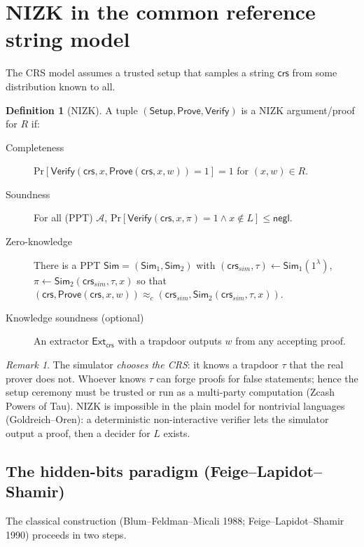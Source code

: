\documentclass[11pt,a4paper]{report}
\theoremstyle{plain}
\theoremstyle{definition}
\newtheorem{definition}[theorem]{Definition}
\theoremstyle{remark}
\newtheorem{remark}[theorem]{Remark}
\newcommand{\negl}{\mathsf{negl}}
\renewcommand{\Pr}{\mathrm{Pr}}
\newcommand{\Sim}{\mathsf{Sim}}\newcommand{\Ext}{\mathsf{Ext}}
\newcommand{\Setup}{\mathsf{Setup}}\newcommand{\Com}{\mathsf{Com}}
\begin{document}
\section{NIZK in the common reference string model}
The CRS model assumes a trusted setup that samples a string $\mathsf{crs}$ from some distribution known to all.
\begin{definition}[NIZK]\label{def:nizk}
A tuple $(\Setup,\mathsf{Prove},\mathsf{Verify})$ is a NIZK argument/proof for $R$ if:
\begin{description}
\item[Completeness] $\Pr[\mathsf{Verify}(\mathsf{crs},x,\mathsf{Prove}(\mathsf{crs},x,w))=1]=1$ for $(x,w)\in R$.
\item[Soundness] For all (PPT) $\mathcal A$, $\Pr[\mathsf{Verify}(\mathsf{crs},x,\pi)=1\wedge x\notin L]\le\negl$.
\item[Zero-knowledge] There is a PPT $\Sim=(\Sim_1,\Sim_2)$ with $(\mathsf{crs}_{sim},\tau)\leftarrow\Sim_1(1^\lambda)$, $\pi\leftarrow\Sim_2(\mathsf{crs}_{sim},\tau,x)$ so that $(\mathsf{crs},\mathsf{Prove}(\mathsf{crs},x,w))\approx_c(\mathsf{crs}_{sim},\Sim_2(\mathsf{crs}_{sim},\tau,x))$.
\item[Knowledge soundness (optional)] An extractor $\Ext_{\mathsf{crs}}$ with a trapdoor outputs $w$ from any accepting proof.
\end{description}
\end{definition}
\begin{remark}
The simulator \emph{chooses the CRS}: it knows a trapdoor $\tau$ that the real prover does not. Whoever knows $\tau$ can forge proofs for false statements; hence the setup ceremony must be trusted or run as a multi-party computation (Zcash Powers of Tau). NIZK is impossible in the plain model for nontrivial languages (Goldreich--Oren): a deterministic non-interactive verifier lets the simulator output a proof, then a decider for $L$ exists.
\end{remark}

\subsection{The hidden-bits paradigm (Feige--Lapidot--Shamir)}
The classical construction (Blum--Feldman--Micali 1988; Feige--Lapidot--Shamir 1990) proceeds in two steps.
\end{document}
